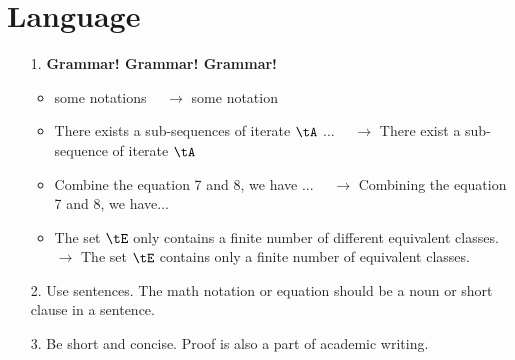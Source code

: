 \documentclass[11pt]{article}
\theoremstyle{plain}
\theoremstyle{definition}
\begin{document}
\section{Language}
\begin{enumerate}
    \item[1.] \textbf{Grammar! Grammar! Grammar!} 
    \begin{itemize}
        \item some notations $\quad \rightarrow$ some notation
        \item There exists a sub-sequences of iterate $\tA$ ...  $\quad \rightarrow$ There exist a sub-sequence of iterate $\tA$
        \item Combine the equation 7 and 8, we have ... $\quad \rightarrow$ Combining the equation 7 and 8, we have...
        \item The set $\tE$ only contains a finite number of different equivalent classes. \\$ \rightarrow$  The set $\tE$ contains only a finite number of equivalent classes. 
    \end{itemize}
    \item[2.] Use sentences. The math notation or equation should be a noun or short clause in a sentence.
    \item[3.] Be short and concise. Proof is also a part of academic writing.
    \begin{itemize}
       

\end{itemize}
\end{enumerate}
\end{document}
